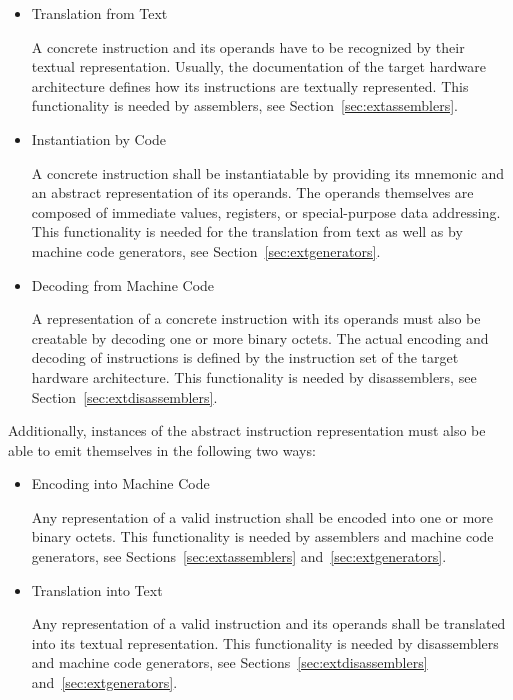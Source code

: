 \begin{itemize}

\item Translation from Text\nopagebreak

A concrete instruction and its operands have to be recognized by their textual representation.
Usually, the documentation of the target hardware architecture defines how its instructions are textually represented.
This functionality is needed by assemblers, see Section~\ref{sec:extassemblers}.

\item Instantiation by Code\nopagebreak

A concrete instruction shall be instantiatable by providing its mnemonic and an abstract representation of its operands.
The operands themselves are composed of immediate values, registers, or special-purpose data addressing.
This functionality is needed for the translation from text as well as by machine code generators, see Section~\ref{sec:extgenerators}.

\item Decoding from Machine Code\nopagebreak

A representation of a concrete instruction with its operands must also be creatable by decoding one or more binary octets.
The actual encoding and decoding of instructions is defined by the instruction set of the target hardware architecture.
This functionality is needed by disassemblers, see Section~\ref{sec:extdisassemblers}.

\end{itemize}

Additionally, instances of the abstract instruction representation must also be able to emit themselves in the following two ways:

\begin{itemize}

\item Encoding into Machine Code\nopagebreak

Any representation of a valid instruction shall be encoded into one or more binary octets.
This functionality is needed by assemblers and machine code generators, see Sections~\ref{sec:extassemblers} and~\ref{sec:extgenerators}.

\item Translation into Text\nopagebreak

Any representation of a valid instruction and its operands shall be translated into its textual representation.
This functionality is needed by disassemblers and machine code generators, see Sections~\ref{sec:extdisassemblers} and~\ref{sec:extgenerators}.

\end{itemize}

